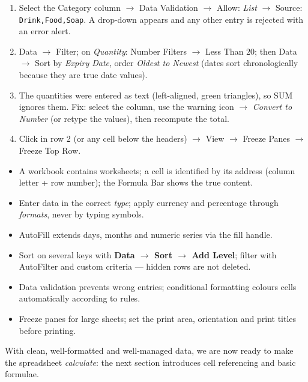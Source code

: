 \documentclass[11pt]{article}
\begin{document}
\begin{corrige}[Exercise 1]
\begin{enumerate}
\item Select the Category column $\rightarrow$ Data Validation $\rightarrow$ Allow: \emph{List} $\rightarrow$ Source: \texttt{Drink,Food,Soap}. A drop-down appears and any other entry is rejected with an error alert.
\item Data $\rightarrow$ Filter; on \emph{Quantity}: Number Filters $\rightarrow$ Less Than $20$; then Data $\rightarrow$ Sort by \emph{Expiry Date}, order \emph{Oldest to Newest} (dates sort chronologically because they are true date values).
\item The quantities were entered as text (left-aligned, green triangles), so SUM ignores them. Fix: select the column, use the warning icon $\rightarrow$ \emph{Convert to Number} (or retype the values), then recompute the total.
\item Click in row 2 (or any cell below the headers) $\rightarrow$ View $\rightarrow$ Freeze Panes $\rightarrow$ Freeze Top Row.
\end{enumerate}
\end{corrige}

\begin{aretenir}
\begin{itemize}
\item A workbook contains worksheets; a cell is identified by its address (column letter + row number); the Formula Bar shows the true content.
\item Enter data in the correct \emph{type}; apply currency and percentage through \emph{formats}, never by typing symbols.
\item AutoFill extends days, months and numeric series via the fill handle.
\item Sort on several keys with \textbf{Data $\rightarrow$ Sort $\rightarrow$ Add Level}; filter with AutoFilter and custom criteria --- hidden rows are not deleted.
\item Data validation prevents wrong entries; conditional formatting colours cells automatically according to rules.
\item Freeze panes for large sheets; set the print area, orientation and print titles before printing.
\end{itemize}
\end{aretenir}

With clean, well-formatted and well-managed data, we are now ready to make the spreadsheet \emph{calculate}: the next section introduces cell referencing and basic formulae.
\end{document}
